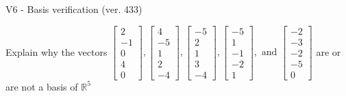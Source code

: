 \begin{exercise}
  \begin{exerciseTitle}V6 - Basis verification (ver. 433)\end{exerciseTitle}
  \begin{exerciseStatement}
    Explain why the vectors \(\left[\begin{array}{r}
2 \\
-1 \\
0 \\
4 \\
0
\end{array}\right] , \left[\begin{array}{r}
4 \\
-5 \\
1 \\
2 \\
-4
\end{array}\right] , \left[\begin{array}{r}
-5 \\
2 \\
1 \\
3 \\
-4
\end{array}\right] , \left[\begin{array}{r}
-5 \\
1 \\
-1 \\
-2 \\
1
\end{array}\right] , \text{ and } \left[\begin{array}{r}
-2 \\
-3 \\
-2 \\
-5 \\
0
\end{array}\right]\) are or are not a basis of \(\mathbb{R}^5\)	



\end{exerciseStatement}
\end{exercise}
